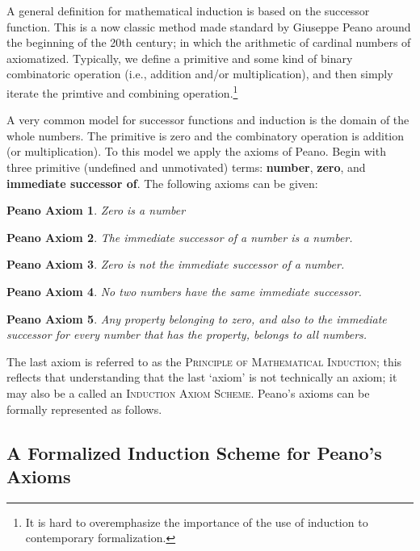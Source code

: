 \documentclass{article}
\begin{document}
A general definition for mathematical induction is based on the successor function. This is a now classic method made standard by Giuseppe Peano around the beginning of the 20th century; in which the arithmetic of cardinal numbers of axiomatized. Typically, we define a primitive and some kind of binary combinatoric operation (i.e., addition and/or multiplication), and then simply iterate the primtive and combining operation.\footnote{It is hard to overemphasize the importance of the use of induction to contemporary formalization.}

A very common model for successor functions and induction is the domain of the whole numbers. The primitive is zero and the combinatory operation is addition (or multiplication). To this model we apply the axioms of Peano.
Begin with three primitive (undefined and unmotivated) terms: \textbf{number}, \textbf{zero}, and \textbf{immediate successor of}. The following axioms can be given:

\newtheorem{peanoaxiom}{Peano Axiom}
\begin{peanoaxiom}
    Zero is a number
\end{peanoaxiom}
\begin{peanoaxiom}
    The immediate successor of a number is a number.
\end{peanoaxiom}
\begin{peanoaxiom}
    Zero is not the immediate successor of a number.
\end{peanoaxiom}
\begin{peanoaxiom}
    No two numbers have the same immediate successor.
\end{peanoaxiom}
\begin{peanoaxiom}\label{induction}
    Any property belonging to zero, and also to the immediate successor for every number that has the property, belongs to all numbers.
\end{peanoaxiom}

The last axiom is referred to as the \textsc{Principle of Mathematical Induction}; this reflects that understanding that the last `axiom' is not technically an axiom; it may also be a called an \textsc{Induction Axiom Scheme}. Peano's axioms can be formally represented as follows.

\subsection{A Formalized Induction Scheme for Peano's Axioms} 
\end{document}
